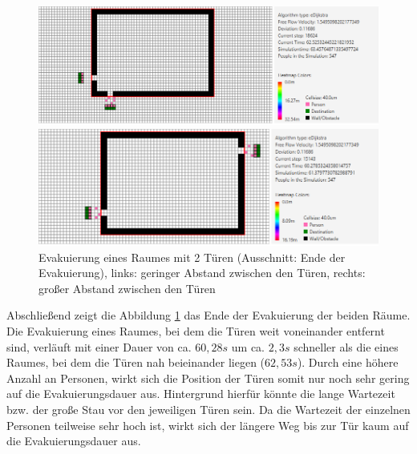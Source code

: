 \begin{figure}[!htb]
	\centering
	\begin{minipage}{.5\textwidth}
		\centering
		\includegraphics[width=\textwidth]{abbildungen/Evak2TMinDis2ENDE.png}
	\end{minipage}%
	\begin{minipage}{0.5\textwidth}
		\centering
		\includegraphics[width=\textwidth]{abbildungen/Evak2TMaxDis2ENDE.png}
	\end{minipage}
	\caption{Evakuierung eines Raumes mit 2 Türen (Ausschnitt: Ende der Evakuierung), links: geringer Abstand zwischen den Türen, rechts: großer Abstand zwischen den Türen}
	\label{fig:Evak2TminmaxDis2ENDE}
\end{figure}

Abschließend zeigt die Abbildung \ref{fig:Evak2TminmaxDis2ENDE} das Ende der Evakuierung der beiden Räume. Die Evakuierung eines Raumes, bei dem die Türen weit voneinander entfernt sind, verläuft mit einer Dauer von ca. $60,28s$ um ca. $2,3s$ schneller als die eines Raumes, bei dem die Türen nah beieinander liegen ($62,53s$). Durch eine höhere Anzahl an Personen, wirkt sich die Position der Türen somit nur noch sehr gering auf die Evakuierungsdauer aus. Hintergrund hierfür könnte die lange Wartezeit bzw. der große Stau vor den jeweiligen Türen sein. Da die Wartezeit der einzelnen Personen teilweise sehr hoch ist, wirkt sich der längere Weg bis zur Tür kaum auf die Evakuierungsdauer aus.





\newpage
